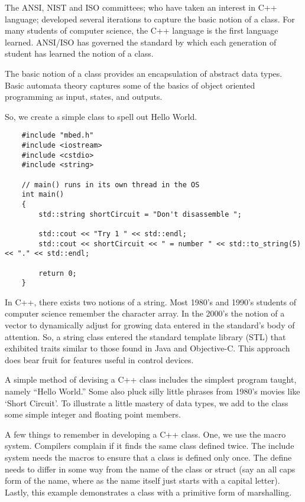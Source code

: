 \documentclass{article}
\begin{document}
The ANSI, NIST and ISO committees; who have taken an interest in C++ language; developed several iterations to capture the basic notion of a class.  For many students of computer science, the C++ language is the first language learned.  ANSI/ISO has governed the standard by which each generation of student has learned the notion of a class.

The basic notion of a class provides an encapsulation of abstract data types.   Basic automata theory captures some of the basics of object oriented programming as input, states, and outputs. 

So, we create a simple class to spell out Hello World. %


\begin{lstlisting}
	#include "mbed.h"
	#include <iostream>
	#include <cstdio>
	#include <string>

	// main() runs in its own thread in the OS
	int main()
	{
	    std::string shortCircuit = "Don't disassemble ";
    
	    std::cout << "Try 1 " << std::endl;
	    std::cout << shortCircuit << " = number " << std::to_string(5) << "." << std::endl;

		return 0;
	}
\end{lstlisting}


In C++, there exists two notions of a string.  Most 1980's and 1990's students of computer science remember the character array.  In the 2000's the notion of a vector to dynamically adjust for growing data entered in the standard's body of attention.  So, a string class entered the standard template library (STL) that exhibited traits similar to those found in Java and Objective-C.  This approach does bear fruit for features useful in control devices.

A simple method of devising a C++ class includes the simplest program taught, namely ``Hello World.''  Some also pluck silly little phrases from 1980's movies like `Short Circuit'.  To illustrate a little mastery of data types, we add to the class some simple integer and floating point members.  

A few things to remember in developing a C++ class.  One, we use the macro system.  Compilers complain if it finds the same class defined twice.  The include system needs the macros to ensure that a class is defined only once.  The define needs to differ in some way from the name of the class or struct (say an all caps form of the name, where as the name itself just starts with a capital letter).  Lastly, this example demonstrates a class with a primitive form of marshalling.
\end{document}
